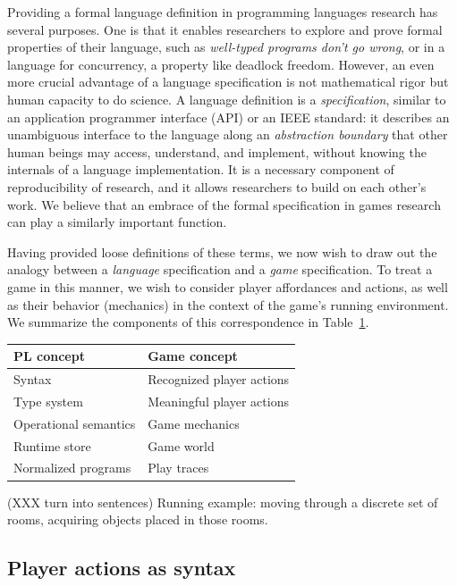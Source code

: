 \documentclass[sigconf]{acmart}
\begin{document}
  Providing a formal language definition in programming languages research
  has several purposes. One is that it enables researchers to explore
  and prove formal properties of their language, such as {\em well-typed
  programs don't go wrong}, or in a language for concurrency, a property
  like deadlock freedom. However, an even more crucial advantage of a
  language specification is not mathematical rigor but human capacity to do
  science. A language definition is a {\em specification}, similar to an
  application programmer interface (API) or an IEEE standard: it describes
  an unambiguous interface to the language along an {\em abstraction
  boundary} that other human beings may access, understand, and implement,
  without knowing the internals of a language implementation.  It is a
  necessary component of reproducibility of research, and it allows
  researchers to build on each other's work. We believe that an embrace of
  the formal specification in games research can play a similarly important
  function.

  Having provided loose definitions of these terms, we now wish to draw out
  the analogy between a {\em language} specification and a {\em game}
  specification. To treat a game in this manner, we wish to consider player
  affordances and actions, as well as their behavior (mechanics) in the
  context of the game's running environment. We summarize the components of
  this correspondence in Table~\ref{tab:correspondence}.

  \begin{table}
  \begin{tabular}{ll}
    PL concept & Game concept\\
    \hline
    Syntax & Recognized player actions \\
    Type system & Meaningful player actions \\
    Operational semantics & Game mechanics \\
    Runtime store & Game world \\
    Normalized programs & Play traces 
  \end{tabular}
  \label{tab:correspondence}
  \end{table}

  (XXX turn into sentences)
  Running example: moving through a discrete set of rooms,
  acquiring objects placed in those rooms.

  \subsection{Player actions as syntax}
\end{document}
